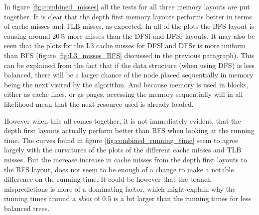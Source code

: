 \documentclass{article}
\begin{document}
In figure \ref{fig:combined_misses} all the tests for all three memory layouts are put together. It is clear that the depth first memory layouts performs better in terms of cache misses and TLB misses, as expected. In all of the plots the BFS layout is causing around 20\% more misses than the DFSl and DFSr layouts. It may also be seen that the plots for the L3 cache misses for DFSl and DFSr is more uniform than BFS (figure \ref{fig:L3_misses_BFS} discussed in the previous paragraph). This can be explained from the fact that if the data structure (when using DFS) is less balanced, there will be a larger chance of the node placed sequentially in memory being the next visited by the algorithm. And because memory is used in blocks, either as cache lines, or as pages, accessing the memory sequentially will in all likelihood mean that the next resource used is already loaded.

However when this all comes together, it is not immediately evident, that the depth first layouts actually perform better than BFS when looking at the running time. The curves found in figure \ref{fig:combined_running_time} seem to agree largely with the curvatures of the plots of the different cache misses and TLB misses. But the increase increase in cache misses from the depth first layouts to the BFS layout, does not seem to be enough of a change to make a notable difference on the running time. It could be however that the branch mispredictions is more of a dominating factor, which might explain why the running times around a \textit{skew} of 0.5 is a bit larger than the running times for less balanced trees.
\end{document}
